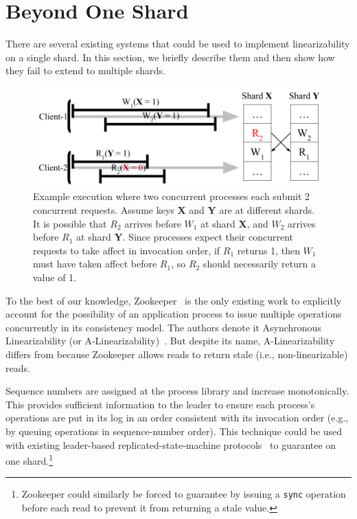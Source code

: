 \section{\MDL{} Beyond One Shard}
\label{sec:mdl:zookeeper}

There are several existing systems that could be used to implement
\multidispatch{} linearizability on a single shard. In this section,
we briefly describe them and then show how they fail to extend to
multiple shards.

\begin{figure}[!htb]
    \includegraphics[scale=.45]{figs/somet.png}
    \caption{Example execution where two concurrent processes each submit 2 concurrent requests. Assume keys \textbf{X} and \textbf{Y} are at different shards. It is possible that $R_2$ arrives before $W_1$ at shard \textbf{X}, and $W_2$ arrives before $R_1$ at shard \textbf{Y}. Since processes expect their concurrent requests to take affect in invocation order, if $R_1$ returns 1, then $W_1$ must have taken affect before $R_1$, so $R_2$ should necessarily return a value of 1.}
    \label{fig:concurrentbatches}
\end{figure}

To the best of our knowledge, Zookeeper~\cite{hunt2010zookeeper} is the
only existing work to explicitly account for the possibility of an 
application process to issue multiple operations concurrently in its
consistency model. The authors denote it Asynchronous Linearizability
(or A-Linearizability)~\cite{hunt2010zookeeper}. But despite its name,
A-Linearizability differs from \MDL{} because Zookeeper allows
reads to return stale (i.e., non-linearizable) reads.

 Sequence numbers are assigned at the process 
library and increase monotonically. This provides sufficient information to 
the leader to ensure each process's operations are put in its log in an
order consistent with its invocation order
(e.g., by queuing operations in sequence-number order).
This technique could be used with existing leader-based replicated-state-machine
protocols~\cite{ongaro2014raft,lamport1998paxos,oki1988vr} to guarantee
\MDL{} on one shard.\footnote{Zookeeper could similarly be forced to
guarantee \MDL{} by issuing a \texttt{sync} operation before each read to prevent it from returning a stale value.}

